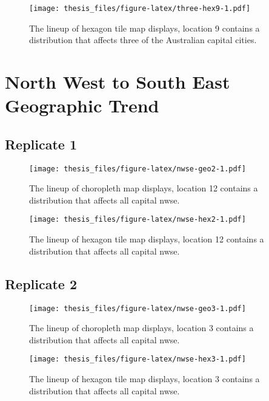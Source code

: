 \documentclass{monashthesis}
\begin{document}
\begin{figure}
\centering
\texttt{[image: thesis\_files/figure-latex/three-hex9-1.pdf]}
\caption{\label{fig:three-hex9}The lineup of hexagon tile map displays, location 9 contains a distribution that affects three of the Australian capital cities.}
\end{figure}

\hypertarget{north-west-to-south-east-geographic-trend}{%
\section{North West to South East Geographic Trend}\label{north-west-to-south-east-geographic-trend}}

\hypertarget{replicate-1-2}{%
\subsection{Replicate 1}\label{replicate-1-2}}

\begin{figure}
\centering
\texttt{[image: thesis\_files/figure-latex/nwse-geo2-1.pdf]}
\caption{\label{fig:nwse-geo2}The lineup of choropleth map displays, location 12 contains a distribution that affects all capital nwse.}
\end{figure}

\begin{figure}
\centering
\texttt{[image: thesis\_files/figure-latex/nwse-hex2-1.pdf]}
\caption{\label{fig:nwse-hex2}The lineup of hexagon tile map displays, location 12 contains a distribution that affects all capital nwse.}
\end{figure}

\hypertarget{replicate-2-2}{%
\subsection{Replicate 2}\label{replicate-2-2}}

\begin{figure}
\centering
\texttt{[image: thesis\_files/figure-latex/nwse-geo3-1.pdf]}
\caption{\label{fig:nwse-geo3}The lineup of choropleth map displays, location 3 contains a distribution that affects all capital nwse.}
\end{figure}

\begin{figure}
\centering
\texttt{[image: thesis\_files/figure-latex/nwse-hex3-1.pdf]}
\caption{\label{fig:nwse-hex3}The lineup of hexagon tile map displays, location 3 contains a distribution that affects all capital nwse.}
\end{figure}
\end{document}
